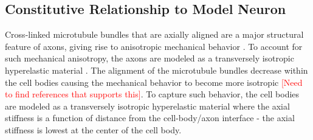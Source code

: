 \documentclass[10pt]{asme2ej}
\begin{document}
\subsection{Constitutive Relationship to Model Neuron}
Cross-linked microtubule bundles that are axially aligned are a major structural feature of axons, giving rise to anisotropic mechanical behavior \cite{Peter:2012fc}. To account for such mechanical anisotropy, the axons are modeled as a transversely isotropic hyperelastic material \cite{JavierBonet:2008uxa,Bonet:1998vc}. The alignment of the microtubule bundles decrease within the cell bodies causing the mechanical behavior to become more isotropic \textcolor{red}{[Need to find references that supports this]}. To capture such behavior, the cell bodies are modeled as a transversely isotropic hyperelastic material where the axial stiffness is a function of distance from the cell-body/axon interface - the axial stiffness is lowest at the center of the cell body. 

\end{document}
